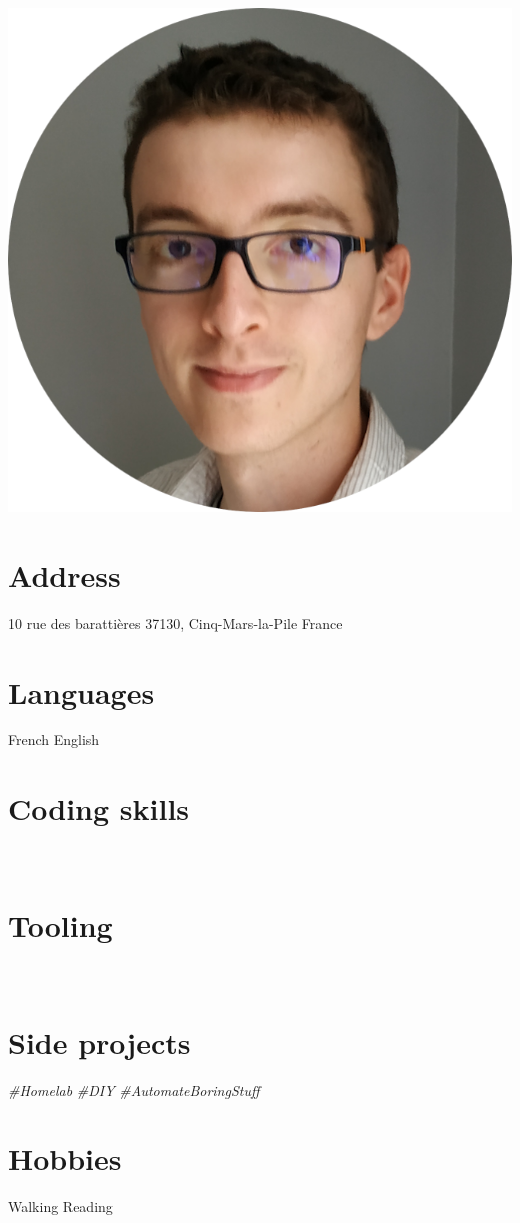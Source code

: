 \documentclass[]{friggeri-cv}
\begin{document}
\begin{aside}
  \includegraphics[scale=0.2]{../img/photo.png} 
    \section{Address}
    10 rue des barattières
    37130, Cinq-Mars-la-Pile
    France
    ~
  \section{Languages}
    French 
    English 
    ~
  \section{Coding skills}
    ~
  \section{Tooling}
    ~
   \section{Side projects}
    \textit{\#Homelab}
    \textit{\#DIY}
    \textit{\#AutomateBoringStuff}
    ~
    \section{Hobbies}
    Walking
    Reading
    ~
\end{aside}
~
\end{document}
